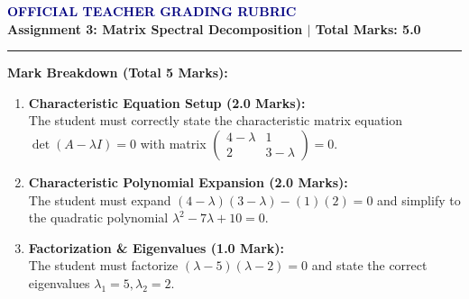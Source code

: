 \documentclass[11pt,a4paper]{article}
\begin{document}
\begin{center}
    {\large\bfseries\textcolor{navy}{OFFICIAL TEACHER GRADING RUBRIC}}\\[0.1cm]
    {\normalsize\textbf{Assignment 3: Matrix Spectral Decomposition $\mid$ Total Marks: 5.0}}
\end{center}
\hrule
\vspace{0.6cm}

\noindent\textbf{Mark Breakdown (Total 5 Marks):}
\begin{enumerate}
    \item \textbf{Characteristic Equation Setup (2.0 Marks):}\\
    The student must correctly state the characteristic matrix equation $\det(A - \lambda I) = 0$ with matrix $\begin{pmatrix} 4-\lambda & 1 \\ 2 & 3-\lambda \end{pmatrix} = 0$.
    \item \textbf{Characteristic Polynomial Expansion (2.0 Marks):}\\
    The student must expand $(4-\lambda)(3-\lambda) - (1)(2) = 0$ and simplify to the quadratic polynomial $\lambda^2 - 7\lambda + 10 = 0$.
    \item \textbf{Factorization \& Eigenvalues (1.0 Mark):}\\
    The student must factorize $(\lambda - 5)(\lambda - 2) = 0$ and state the correct eigenvalues $\lambda_1 = 5, \lambda_2 = 2$.
\end{enumerate}
\end{document}
